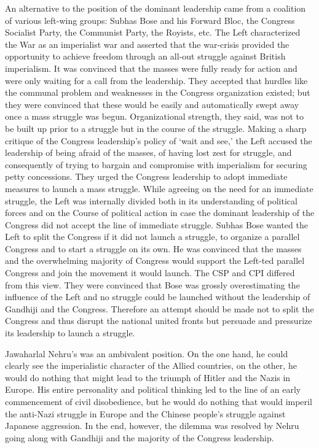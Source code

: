An alternative to the position of the dominant leadership came from a coalition of various left-wing groups: Subhas Bose and his Forward Bloc, the Congress Socialist Party, the Communist Party, the Royists, etc. The Left characterized the War as an imperialist war and asserted that the war-crisis provided the opportunity to achieve freedom through an all-out struggle against British imperialism. It was convinced that the masses were fully ready for action and were only waiting for a call from the leadership. They accepted that hurdles like the communal problem and weaknesses in the Congress organization existed; but they were convinced that these would be easily and automatically swept away once a mass struggle was begun. Organizational strength, they said, was not to be built up prior to a struggle but in the course of the struggle. Making a sharp critique of the Congress leadership’s policy of ‘wait and see,’ the Left accused the leadership of being afraid of the masses, of having lost zest for struggle, and consequently of trying to bargain and compromise with imperialism for securing petty concessions. They urged the Congress leadership to adopt immediate measures to launch a mass struggle. While agreeing on the need for an immediate struggle, the Left was internally divided both in its understanding of political forces and on the Course of political action in case the dominant leadership of the Congress did not accept the line of immediate struggle. Subhas Bose wanted the Left to split the Congress if it did not launch a struggle, to organize a parallel Congress and to start a struggle on its own. He was convinced that the masses and the overwhelming majority of Congress would support the Left-ted parallel Congress and join the movement it would launch. The CSP and CPI differed from this view. They were convinced that Bose was grossly overestimating the influence of the Left and no struggle could be launched without the leadership of Gandhiji and the Congress. Therefore an attempt should be made not to split the Congress and thus disrupt the national united fronts but persuade and pressurize its leadership to launch a struggle. 

Jawaharlal Nehru’s was an ambivalent position. On the one hand, he could clearly see the imperialistic character of the Allied countries, on the other, he would do nothing that might lead to the triumph of Hitler and the Nazis in Europe. His entire personality and political thinking led to the line of an early commencement of civil disobedience, but he would do nothing that would imperil the anti-Nazi struggle in Europe and the Chinese people’s struggle against Japanese aggression. In the end, however, the dilemma was resolved by Nehru going along with Gandhiji and the majority of the Congress leadership. 

